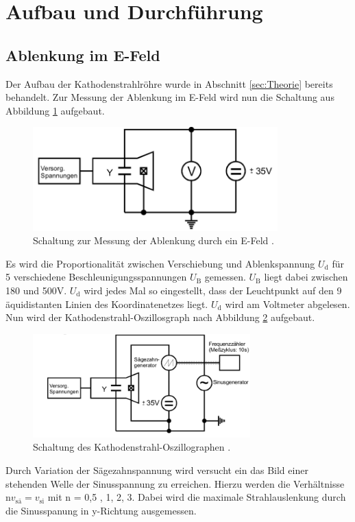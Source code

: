 \section{Aufbau und Durchführung}
\label{sec:Aufbau}
\subsection{Ablenkung im E-Feld}

Der Aufbau der Kathodenstrahlröhre wurde in Abschnitt \ref{sec:Theorie} bereits behandelt.
Zur Messung der Ablenkung im E-Feld wird nun die Schaltung aus Abbildung \ref{fig:ESchaltung1} aufgebaut.
\begin{figure}
    \centering
    \includegraphics[height=4cm]{Aufbau/ESchaltung1.pdf}
    \caption{Schaltung zur Messung der Ablenkung durch ein E-Feld \cite{V501}.}
    \label{fig:ESchaltung1}
\end{figure}
Es wird die Proportionalität zwischen Verschiebung und Ablenkspannung $U_\text{d}$ für 5 verschiedene Beschleunigungsspannungen $U_\text{B}$ gemessen. $U_\text{B}$ liegt dabei zwischen 180 und 500V.
$U_\text{d}$ wird jedes Mal so eingestellt, dass der Leuchtpunkt auf den 9 äquidistanten Linien des Koordinatenetzes liegt. $U_\text{d}$ wird am Voltmeter abgelesen.
\\
Nun wird der Kathodenstrahl-Oszillosgraph nach Abbildung \ref{fig:ESchaltung2} aufgebaut.
\begin{figure}
    \centering
    \includegraphics[height=4cm]{Aufbau/ESchaltung2.pdf}
    \caption{Schaltung des Kathodenstrahl-Oszillographen \cite{V501}.}
    \label{fig:ESchaltung2}
\end{figure}
Durch Variation der Sägezahnspannung wird versucht ein das Bild einer stehenden Welle der Sinusspannung zu erreichen.
Hierzu werden die Verhältnisse $\text{n} v_\text{sä} = v_\text{si}$ mit n = 0,5 , 1, 2, 3. Dabei wird die maximale Strahlauslenkung durch die Sinusspanung in y-Richtung ausgemessen.

